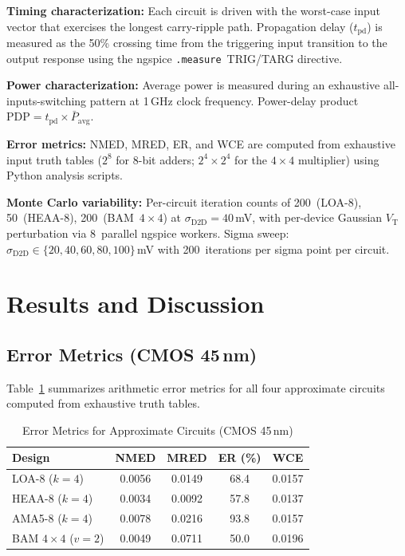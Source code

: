 \documentclass[letterpaper, 10 pt, conference]{ieeeconf}  %
\newcommand{\VT}{V_{\mathrm{T}}}
\newcommand{\sigDD}{\sigma_{\mathrm{D2D}}}
\begin{document}
\textbf{Timing characterization:} Each circuit is driven with the worst-case
input vector that exercises the longest carry-ripple path. Propagation delay
($t_{\mathrm{pd}}$) is measured as the 50\% crossing time from the triggering
input transition to the output response using the ngspice
\texttt{.measure}~TRIG/TARG directive.

\textbf{Power characterization:} Average power is measured during an
exhaustive all-inputs-switching pattern at 1\,GHz clock frequency.
Power-delay product $\mathrm{PDP} = t_{\mathrm{pd}} \times \bar{P}_{\mathrm{avg}}$.

\textbf{Error metrics:} NMED, MRED, ER, and WCE are computed from exhaustive
input truth tables ($2^{8}$ for 8-bit adders; $2^{4}\times2^{4}$ for the
$4\times4$ multiplier) using Python analysis scripts.

\textbf{Monte Carlo variability:} Per-circuit iteration counts of 200~(LOA-8),
50~(HEAA-8), 200~(BAM~$4\times4$) at $\sigDD = 40$\,mV, with per-device
Gaussian $\VT$ perturbation via 8~parallel ngspice workers. Sigma sweep:
$\sigDD \in \{20, 40, 60, 80, 100\}$\,mV with 200~iterations per sigma point
per circuit.


\section{Results and Discussion}

\subsection{Error Metrics (CMOS 45\,nm)}

Table~\ref{tab:error} summarizes arithmetic error metrics for all four
approximate circuits computed from exhaustive truth tables.

\begin{table}[t]
  \caption{Error Metrics for Approximate Circuits (CMOS 45\,nm)}
  \label{tab:error}
  \begin{center}
    \small
    \begin{tabular}{lcccc}
      \toprule
      \textbf{Design}    & \textbf{NMED} & \textbf{MRED} & \textbf{ER (\%)} & \textbf{WCE} \\
      \midrule
      LOA-8 ($k{=}4$)        & 0.0056 & 0.0149 & 68.4 & 0.0157 \\
      HEAA-8 ($k{=}4$)       & 0.0034 & 0.0092 & 57.8 & 0.0137 \\
      AMA5-8 ($k{=}4$)       & 0.0078 & 0.0216 & 93.8 & 0.0157 \\
      BAM $4{\times}4$ ($v{=}2$) & 0.0049 & 0.0711 & 50.0 & 0.0196 \\
      \bottomrule
    \end{tabular}
  \end{center}
\end{table}
\end{document}
